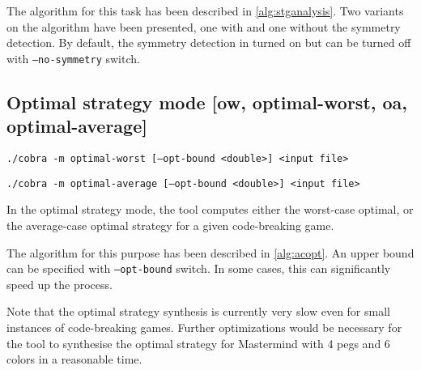 The algorithm for this task has been described in \autoref{alg:stganalysis}.
Two variants on the algorithm have been presented,
  one with and one without the symmetry detection.
By default, the symmetry detection in turned on
  but can be turned off with \texttt{--no-symmetry} switch.

\subsection{Optimal strategy mode [ow, optimal-worst, oa, optimal-average]}

\centerline{\texttt{./cobra -m optimal-worst [--opt-bound <double>] <input file> }}
\centerline{\texttt{./cobra -m optimal-average [--opt-bound <double>] <input file> }}

In the optimal strategy mode, the tool computes either the worst-case optimal,
  or the average-case optimal strategy for a given code-breaking game.

The algorithm for this purpose has been described in \autoref{alg:acopt}.
An upper bound can be specified with \texttt{--opt-bound} switch.
In some cases, this can significantly speed up the process.

Note that the optimal strategy synthesis is currently very slow even for
  small instances of code-breaking games.
Further optimizations would be necessary for the tool to synthesise the optimal
  strategy for Mastermind with 4 pegs and 6 colors in a reasonable time.
